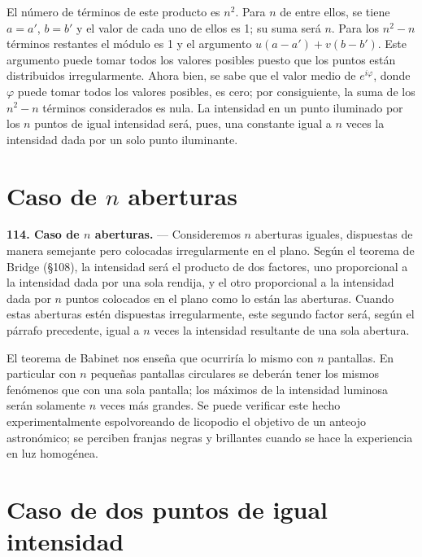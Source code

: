 El número de términos de este producto es $n^2$. Para $n$ de entre ellos,
se tiene $a=a'$, $b=b'$ y el valor de cada uno de ellos es 1; su suma
será $n$. Para los $n^2-n$ términos restantes el módulo es 1 y el
argumento $u(a-a')+v(b-b')$. Este argumento puede tomar todos los valores
posibles puesto que los puntos están distribuidos irregularmente. Ahora
bien, se sabe que el valor medio de $e^{i\varphi}$, donde $\varphi$ puede
tomar todos los valores posibles, es cero; por consiguiente, la suma de
los $n^2-n$ términos considerados es nula. La intensidad en un punto
iluminado por los $n$ puntos de igual intensidad será, pues, una
constante igual a $n$ veces la intensidad dada por un solo punto
iluminante.

\section{Caso de \texorpdfstring{$n$}{n} aberturas}

\noindent\textbf{114. Caso de $n$ aberturas.} — Consideremos $n$ aberturas
iguales, dispuestas de manera semejante pero colocadas irregularmente en
el plano. Según el teorema de Bridge (§108), la intensidad será el
producto de dos factores, uno proporcional a la intensidad dada por una
sola rendija, y el otro proporcional a la intensidad dada por $n$ puntos
colocados en el plano como lo están las aberturas. Cuando estas aberturas
estén dispuestas irregularmente, este segundo factor será, según el
párrafo precedente, igual a $n$ veces la intensidad resultante de una
sola abertura.

El teorema de Babinet nos enseña que ocurriría lo mismo con $n$ pantallas.
En particular con $n$ pequeñas pantallas circulares se deberán tener los
mismos fenómenos que con una sola pantalla; los máximos de la intensidad
luminosa serán solamente $n$ veces más grandes. Se puede verificar este
hecho experimentalmente espolvoreando de licopodio el objetivo de un
anteojo astronómico; se perciben franjas negras y brillantes cuando se
hace la experiencia en luz homogénea.

\section{Caso de dos puntos de igual intensidad}

